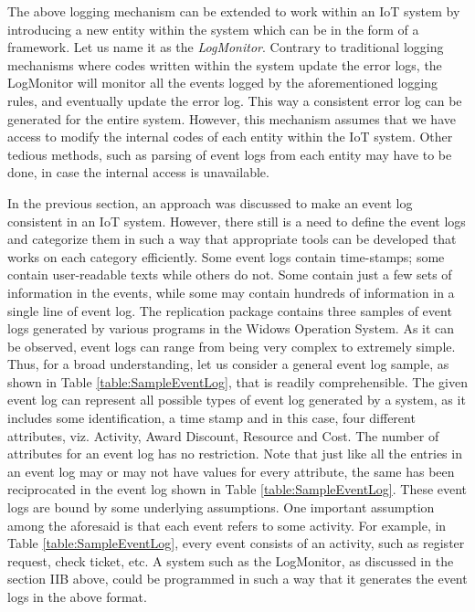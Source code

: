 The above logging mechanism can be extended to work within an IoT system by introducing a new entity within the system which can be in the form of a framework. Let us name it as the \textit{LogMonitor}. Contrary to traditional logging mechanisms where codes written within the system update the error logs, the LogMonitor will monitor all the events logged by the aforementioned logging rules, and eventually update the error log. This way a consistent error log can be generated for the entire system. However, this mechanism assumes that we have access to modify the internal codes of each entity within the IoT system. Other tedious methods, such as parsing of event logs\cite{he2017towards,Du2017} from each entity may have to be done, in case the internal access is unavailable.


In the previous section, an approach was discussed to make an event log consistent in an IoT system. However, there still is a need to define the event logs and categorize them in such a way that appropriate tools can be developed that works on each category efficiently. Some event logs contain time-stamps; some contain user-readable texts while others do not. Some contain just a few sets of information in the events, while some may contain hundreds of information in a single line of event log. The replication package\cite{Singh2019} contains three samples of event logs generated by various programs in the Widows Operation System. As it can be observed, event logs can range from being very complex to extremely simple. Thus, for a broad understanding, let us consider a general event log sample\cite{ProcessMiningGroupMathAndCSdepartment}, as shown in Table \ref{table:SampleEventLog}, that is readily comprehensible. The given event log can represent all possible types of event log generated by a system, as it includes some identification, a time stamp and in this case, four different attributes, viz. Activity, Award Discount, Resource and Cost. The number of attributes for an event log has no restriction. Note that just like all the entries in an event log may or may not have values for every attribute, the same has been reciprocated in the event log shown in Table \ref{table:SampleEventLog}. These event logs are bound by some underlying assumptions\cite{VanderAalst2011d}. One important assumption among the aforesaid is that each event refers to some activity. For example, in Table \ref{table:SampleEventLog}, every event consists of an activity, such as register request, check ticket, etc. A system such as the LogMonitor, as discussed in the section IIB above, could be programmed in such a way that it generates the event logs in the above format.

